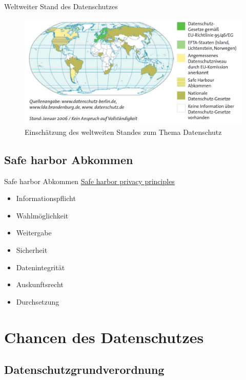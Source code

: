 \documentclass{beamer}
\begin{document}
\begin{frame}{Weltweiter Stand des Datenschutzes}
\begin{figure}[h]
\begin{center}
	\includegraphics[scale=0.28]{pics/datenschutzstand.png}
\end{center}
\caption{Einschätzung des weltweiten Standes zum Thema Datenschutz}
\label{pic:worldmap}
\end{figure}
\end{frame}

\subsection{Safe harbor Abkommen}
\begin{frame}{Safe harbor Abkommen}
\underline{Safe harbor privacy principles}
\begin{itemize}
	\item Informationspflicht
	\item Wahlmöglichkeit
	\item Weitergabe
	\item Sicherheit
	\item Datenintegrität
	\item Auskunftsrecht
	\item Durchsetzung
\end{itemize}
\end{frame}

\section{Chancen des Datenschutzes}
\begin{frame}{}
\end{frame}


\subsection{Datenschutzgrundverordnung}
\begin{frame}{}
\end{frame}
\end{document}
